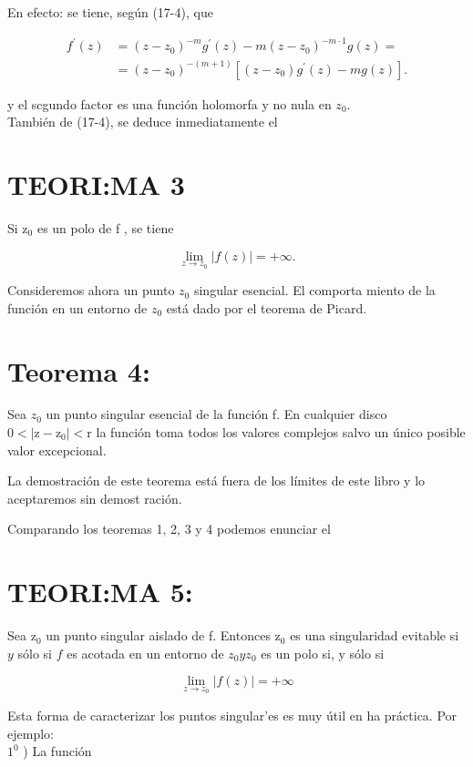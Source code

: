 \documentclass[10pt]{article}
\theoremstyle{plain}
\theoremstyle{definition}
\theoremstyle{remark}
\begin{document}
En efecto: se tiene, según (17-4), que

$$
\begin{aligned}
f^{\prime}(z) & =\left(z-z_{0}\right)^{-m} g^{\prime}(z)-m\left(z-z_{0}\right)^{-m \cdot 1} g(z)= \\
& =\left(z-z_{0}\right)^{-(m+1)}\left[\left(z-z_{0}\right) g^{\prime}(z)-m g(z)\right] .
\end{aligned}
$$

y el scgundo factor es una función holomorfa y no nula en $z_{0}$.\\
También de (17-4), se deduce inmediatamente el

\section*{TEORI:MA 3}
Si $\mathrm{z}_0$ es un polo de f , se tiene


\begin{equation*}
\lim _{z \rightarrow z_{0}}|f(z)|=+\infty . \tag{17-5}
\end{equation*}


Consideremos ahora un punto $z_{0}$ singular esencial. El comporta miento de la función en un entorno de $z_{0}$ está dado por el teorema de Picard.

\section*{Teorema 4:}
Sea $z_{0}$ un punto singular esencial de la función f. En cualquier disco $0<\left|\mathrm{z}-\mathrm{z}_{0}\right|<\mathrm{r}$ la función toma todos los valores complejos salvo un único posible valor excepcional.

La demostración de este teorema está fuera de los límites de este libro y lo aceptaremos sin demost ración.

Comparando los teoremas 1, 2, 3 y 4 podemos enunciar el

\section*{TEORI:MA 5:}
Sea $\mathrm{z}_{0}$ un punto singular aislado de f. Entonces $\mathrm{z}_{0}$ es una singularidad evitable si $y$ sólo si $f$ es acotada en un entorno de $z_{0} y z_{0}$ es un polo si, y sólo si

$$
\lim _{z \rightarrow z_{0}}|f(z)|=+\infty
$$

Esta forma de caracterizar los puntos singular'es es muy útil en ha práctica. Por ejemplo:\\
$1^{0}$ ) La función
\end{document}
